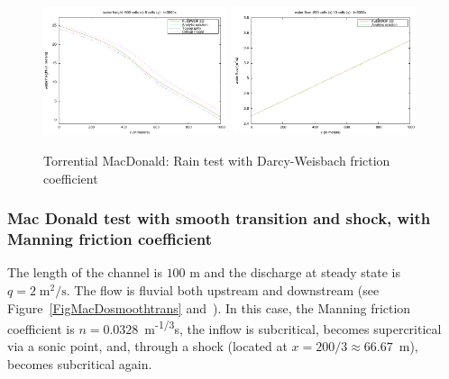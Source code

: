 \documentclass[a4paper, 11pt]{article}
\begin{document}

\begin{figure}[htbp]
	\includegraphics[width=0.48\textwidth]{Figures_FullSWOF_2D/MacDo_rain_tor_DW_h}\ \includegraphics[width=0.48\textwidth]{Figures_FullSWOF_2D/MacDo_rain_tor_DW_q}
	\caption{Torrential MacDonald: Rain test with Darcy-Weisbach friction coefficient}
	\label{FigRain_tor}
\end{figure}

\subsubsection{Mac Donald test with smooth transition and shock, with Manning friction coefficient}
               
The length of the channel is $100$ m and the discharge at steady state is $q=2 \;\text{m}^2/\text{s}$. The flow
 is fluvial both upstream and downstream (see Figure~\ref{FigMacDosmoothtrans} and~\citep[§~3.2.2]{Delestre13}).
In this case, the Manning friction coefficient is $n = 0.0328$~m\textsuperscript{-1/3}s, the inflow is subcritical,
becomes supercritical via a sonic point, and, through a shock (located at $x=200/3 \approx 66.67$~m), becomes subcritical again.
\end{document}
